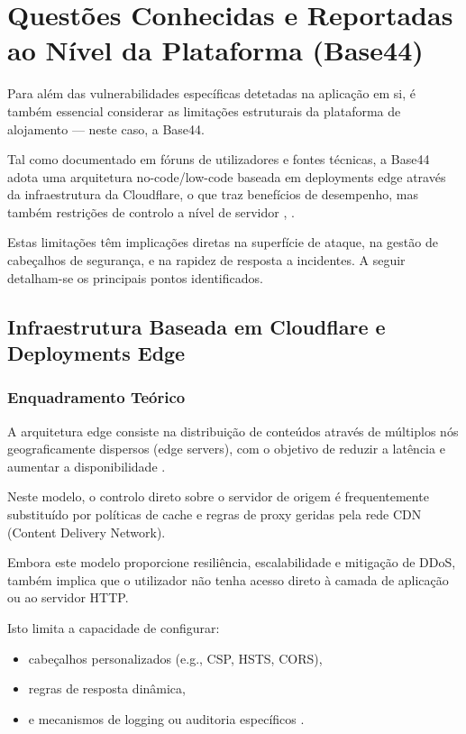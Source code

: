 \section{Questões Conhecidas e Reportadas ao Nível da Plataforma (Base44)}

Para além das vulnerabilidades específicas detetadas na aplicação em si, é também essencial considerar as limitações estruturais da plataforma de alojamento — neste caso, a Base44.

Tal como documentado em fóruns de utilizadores e fontes técnicas, a Base44 adota uma arquitetura no-code/low-code baseada em deployments edge através da infraestrutura da Cloudflare, o que traz benefícios de desempenho, mas também restrições de controlo a nível de servidor \cite{ref16}, \cite{ref2}.

Estas limitações têm implicações diretas na superfície de ataque, na gestão de cabeçalhos de segurança, e na rapidez de resposta a incidentes. A seguir detalham-se os principais pontos identificados.

\subsection{Infraestrutura Baseada em Cloudflare e Deployments Edge}

\subsubsection{Enquadramento Teórico}

A arquitetura edge consiste na distribuição de conteúdos através de múltiplos nós geograficamente dispersos (edge servers), com o objetivo de reduzir a latência e aumentar a disponibilidade \cite{ref17}.

Neste modelo, o controlo direto sobre o servidor de origem é frequentemente substituído por políticas de cache e regras de proxy geridas pela rede CDN (Content Delivery Network).

Embora este modelo proporcione resiliência, escalabilidade e mitigação de DDoS, também implica que o utilizador não tenha acesso direto à camada de aplicação ou ao servidor HTTP.

Isto limita a capacidade de configurar:

\begin{itemize}

\item cabeçalhos personalizados (e.g., CSP, HSTS, CORS),

\item regras de resposta dinâmica,

\item e mecanismos de logging ou auditoria específicos \cite{ref18}.

\end{itemize}


